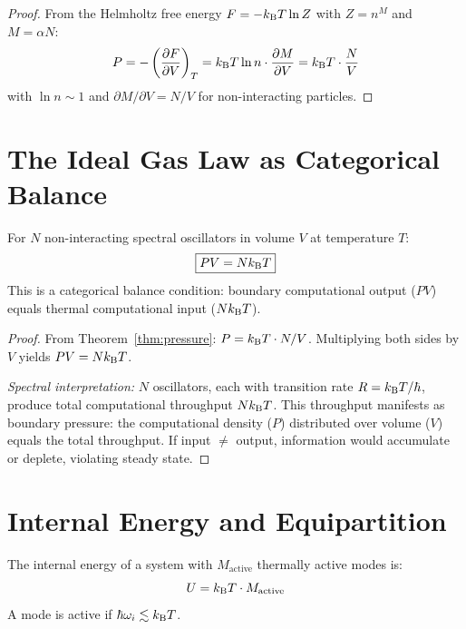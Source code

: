 \begin{proof}
From the Helmholtz free energy $F = -k_{\mathrm{B}} T \ln Z$ with $Z = n^M$ and $M = \alpha N$:
\begin{equation}
    P = -\left(\frac{\partial F}{\partial V}\right)_T = k_{\mathrm{B}} T \ln n \cdot \frac{\partial M}{\partial V} = k_{\mathrm{B}} T \cdot \frac{N}{V}
\end{equation}
with $\ln n \sim 1$ and $\partial M/\partial V = N/V$ for non-interacting particles.
\end{proof}

\section{The Ideal Gas Law as Categorical Balance}
\label{sec:ideal_gas}

\begin{theorem}
\label{thm:ideal_gas}
For $N$ non-interacting spectral oscillators in volume $V$ at temperature $T$:
\begin{equation}
\boxed{PV = Nk_{\mathrm{B}} T}
\end{equation}
This is a categorical balance condition: boundary computational output ($PV$) equals thermal computational input ($Nk_{\mathrm{B}} T$).
\end{theorem}

\begin{proof}
From Theorem~\ref{thm:pressure}: $P = k_{\mathrm{B}} T \cdot N/V$. Multiplying both sides by $V$ yields $PV = Nk_{\mathrm{B}} T$.

\emph{Spectral interpretation:} $N$ oscillators, each with transition rate $R = k_{\mathrm{B}} T/\hbar$, produce total computational throughput $Nk_{\mathrm{B}} T$. This throughput manifests as boundary pressure: the computational density ($P$) distributed over volume ($V$) equals the total throughput. If input $\neq$ output, information would accumulate or deplete, violating steady state.
\end{proof}

\section{Internal Energy and Equipartition}
\label{sec:energy}

\begin{theorem}
\label{thm:energy}
The internal energy of a system with $M_{\mathrm{active}}$ thermally active modes is:
\begin{equation}
    U = k_{\mathrm{B}} T \cdot M_{\mathrm{active}}
\end{equation}
A mode is active if $\hbar\omega_i \lesssim k_{\mathrm{B}} T$.
\end{theorem}

